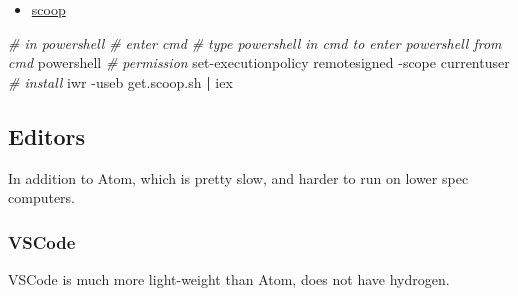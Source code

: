 \documentclass[]{article}
\newenvironment{Shaded}{\begin{snugshade}}{\end{snugshade}}
\newcommand{\CommentTok}[1]{\textcolor[rgb]{0.56,0.35,0.01}{\textit{#1}}}
\newcommand{\ExtensionTok}[1]{#1}
\newcommand{\KeywordTok}[1]{\textcolor[rgb]{0.13,0.29,0.53}{\textbf{#1}}}
\newcommand{\NormalTok}[1]{#1}
\providecommand{\tightlist}{%
  \setlength{\itemsep}{0pt}\setlength{\parskip}{0pt}}
\begin{document}
\begin{itemize}
\tightlist
\item
  \href{https://github.com/lukesampson/scoop/wiki/Quick-Start}{scoop}
\end{itemize}

\begin{Shaded}
\begin{Highlighting}[]
\CommentTok{# in powershell}
\CommentTok{# enter cmd}
\CommentTok{# type powershell in cmd to enter powershell from cmd}
\ExtensionTok{powershell}
\CommentTok{# permission}
\ExtensionTok{set-executionpolicy}\NormalTok{ remotesigned -scope currentuser}
\CommentTok{# install}
\ExtensionTok{iwr}\NormalTok{ -useb get.scoop.sh }\KeywordTok{|} \ExtensionTok{iex}
\end{Highlighting}
\end{Shaded}

\hypertarget{editors}{%
\subsection{Editors}\label{editors}}

In addition to Atom, which is pretty slow, and harder to run on lower
spec computers.

\hypertarget{vscode}{%
\subsubsection{VSCode}\label{vscode}}

VSCode is much more light-weight than Atom, does not have hydrogen.
\end{document}
